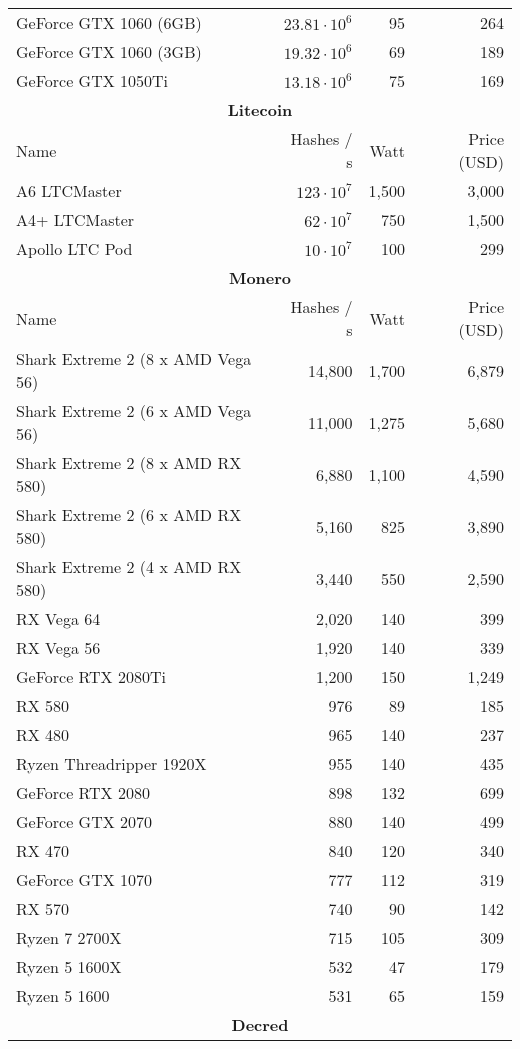 \begin{longtable}{|p{}|r|r|r|}
  GeForce GTX 1060 (6GB) & $23.81 \cdot 10^{6}$ & 95 & 264 \\
  GeForce GTX 1060 (3GB) & $19.32 \cdot 10^{6}$ & 69 & 189 \\
  GeForce GTX 1050Ti & $13.18 \cdot 10^{6}$ & 75 & 169 \\
  \hline
  \multicolumn{4}{|c|}{\textbf{Litecoin}} \\
  \hline
  Name & Hashes / s & Watt & Price (USD) \\
  \hhline{|=|=|=|=|}
  A6 LTCMaster & $123 \cdot 10^{7}$ & 1,500 & 3,000 \\
  A4+ LTCMaster & $62 \cdot 10^{7}$ & 750 & 1,500 \\
  Apollo LTC Pod & $10 \cdot 10^{7}$ & 100 & 299 \\
  \hline
  \hline
  \multicolumn{4}{|c|}{\textbf{Monero}} \\
  \hline
  Name & Hashes / s & Watt & Price (USD) \\
  \hhline{|=|=|=|=|}
  Shark Extreme 2 (8 x AMD Vega 56) & 14,800 & 1,700 & 6,879 \\
  Shark Extreme 2 (6 x AMD Vega 56) & 11,000 & 1,275 & 5,680 \\
  Shark Extreme 2 (8 x AMD RX 580) & 6,880 & 1,100 & 4,590 \\
  Shark Extreme 2 (6 x AMD RX 580) & 5,160 & 825 & 3,890 \\
  Shark Extreme 2 (4 x AMD RX 580) & 3,440 & 550 & 2,590 \\
  RX Vega 64 & 2,020 & 140 & 399 \\
  RX Vega 56 & 1,920 & 140 & 339 \\
  GeForce RTX 2080Ti & 1,200 & 150 & 1,249 \\
  RX 580 & 976 & 89 & 185 \\
  RX 480 & 965 & 140 & 237 \\
  Ryzen Threadripper 1920X & 955 & 140 & 435 \\
  GeForce RTX 2080 & 898 & 132 & 699 \\
  GeForce GTX 2070 & 880 & 140 & 499 \\
  RX 470 & 840 & 120 & 340 \\
  GeForce GTX 1070 & 777 & 112 & 319 \\
  RX 570 & 740 & 90 & 142 \\
  Ryzen 7 2700X & 715 & 105 & 309 \\
  Ryzen 5 1600X & 532 & 47 & 179 \\
  Ryzen 5 1600 & 531 & 65 & 159 \\
  \hline
  \multicolumn{4}{|c|}{\textbf{Decred}} \\

\end{longtable}
